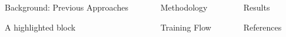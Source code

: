 \documentclass[final]{beamer}
\newlength{\sepwidth}
\newlength{\colwidth}
\newcommand{\separatorcolumn}{\begin{column}{\sepwidth}\end{column}}
\begin{document}
\begin{frame}[t]
\begin{columns}[t]
\begin{column}{\colwidth}
  \begin{block}{Background: Previous Approaches}

  \end{block}

  \begin{alertblock}{A highlighted block}

  \end{alertblock}

\end{column}

\separatorcolumn

\begin{column}{\colwidth}

  \begin{block}{Methodology}

  \end{block}

  \begin{block}{Training Flow}

  \end{block}

\end{column}

\separatorcolumn

\begin{column}{\colwidth}

  \begin{block}{Results}

  \end{block}

  \begin{block}{References}

    \nocite{*}
    \footnotesize{}

  \end{block}

\end{column}

\separatorcolumn
\end{columns}
\end{frame}
\end{document}
